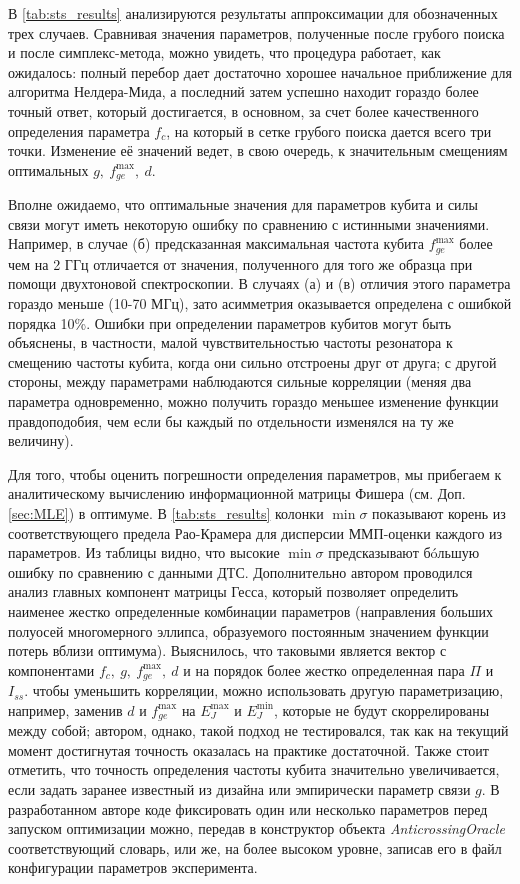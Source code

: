 \documentclass[14pt, a4paper]{extreport}
\numberwithin{equation}{section}
\begin{document}
В \autoref{tab:sts_results} анализируются результаты аппроксимации для обозначенных трех случаев. Сравнивая значения параметров, полученные после грубого поиска и после симплекс-метода, можно увидеть, что процедура работает, как ожидалось: полный перебор дает достаточно хорошее начальное приближение для алгоритма Нелдера-Мида, а последний затем успешно находит гораздо более точный ответ, который достигается, в основном, за счет более качественного определения параметра $f_c$, на который в сетке грубого поиска дается всего три точки. Изменение её значений ведет, в свою очередь, к значительным смещениям оптимальных $g,\ f_{ge}^\text{max},\ d$.

Вполне ожидаемо, что оптимальные значения для параметров кубита и силы связи могут иметь некоторую ошибку по сравнению с истинными значениями. Например, в случае (б) предсказанная максимальная частота кубита $f_{ge}^\text{max}$ более чем на 2 ГГц отличается от значения, полученного для того же образца при помощи двухтоновой спектроскопии. В случаях (а) и (в) отличия этого параметра гораздо меньше (10-70 МГц), зато асимметрия оказывается определена с ошибкой порядка 10\%. Ошибки при определении параметров кубитов могут быть объяснены, в частности, малой чувствительностью частоты резонатора к смещению частоты кубита, когда они сильно отстроены друг от друга; с другой стороны, между параметрами наблюдаются сильные корреляции (меняя два параметра одновременно, можно получить гораздо меньшее изменение функции правдоподобия, чем если бы каждый по отдельности изменялся на ту же величину).

Для того, чтобы оценить погрешности определения параметров, мы прибегаем к аналитическому вычислению информационной матрицы Фишера (см. Доп. \ref{sec:MLE}) в оптимуме. В \autoref{tab:sts_results} колонки $\min\sigma$ показывают корень из соответствующего предела Рао-Крамера для дисперсии ММП-оценки каждого из параметров. Из таблицы видно, что высокие $\min\sigma$ предсказывают бóльшую ошибку по сравнению с данными ДТС. Дополнительно автором проводился анализ главных компонент матрицы Гесса, который позволяет определить наименее жестко определенные комбинации параметров (направления больших полуосей многомерного эллипса, образуемого постоянным значением функции потерь вблизи оптимума). Выяснилось, что таковыми является вектор с компонентами $f_c,\ g,\ f_{ge}^\text{max},\ d$ и на порядок более жестко определенная пара $\Pi$ и $I_{ss}$. чтобы уменьшить корреляции, можно использовать другую параметризацию, например, заменив $d$ и $f_{ge}^\text{max}$ на $E_{J}^\text{max}$ и $E_J^\text{min}$, которые не будут скоррелированы между собой; автором, однако, такой подход не тестировался, так как на текущий момент достигнутая точность оказалась на практике достаточной. Также стоит отметить, что точность определения частоты кубита значительно увеличивается, если задать заранее известный из дизайна или эмпирически параметр связи $g$. В разработанном авторе коде фиксировать один или несколько параметров перед запуском оптимизации можно, передав в конструктор объекта \foreignlanguage{english}{\textit{AnticrossingOracle}} соответствующий словарь, или же, на более высоком уровне, записав его в файл конфигурации параметров эксперимента.
\end{document}
